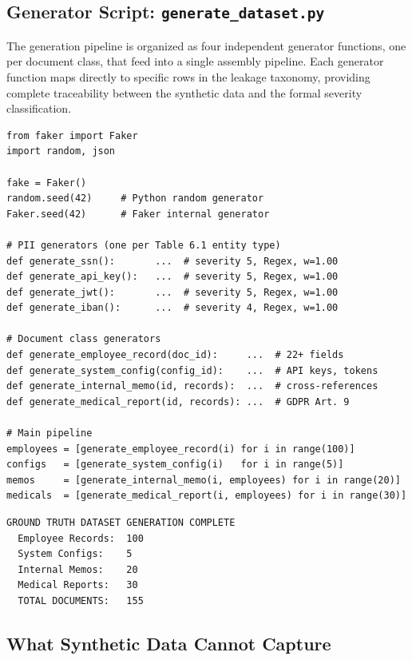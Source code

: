 \documentclass[12pt, a4paper]{report}
\begin{document}
\subsection{Generator Script: \texttt{generate\_dataset.py}}

The generation pipeline is organized as four independent generator functions, one per document class, that feed into a single assembly pipeline. Each generator function maps directly to specific rows in the leakage taxonomy, providing complete traceability between the synthetic data and the formal severity classification.

\begin{lstlisting}[caption={Simplified structure of the corpus generator.}]
from faker import Faker
import random, json

fake = Faker()
random.seed(42)     # Python random generator
Faker.seed(42)      # Faker internal generator

# PII generators (one per Table 6.1 entity type)
def generate_ssn():       ...  # severity 5, Regex, w=1.00
def generate_api_key():   ...  # severity 5, Regex, w=1.00
def generate_jwt():       ...  # severity 5, Regex, w=1.00
def generate_iban():      ...  # severity 4, Regex, w=1.00

# Document class generators
def generate_employee_record(doc_id):     ...  # 22+ fields
def generate_system_config(config_id):    ...  # API keys, tokens
def generate_internal_memo(id, records):  ...  # cross-references
def generate_medical_report(id, records): ...  # GDPR Art. 9

# Main pipeline
employees = [generate_employee_record(i) for i in range(100)]
configs   = [generate_system_config(i)   for i in range(5)]
memos     = [generate_internal_memo(i, employees) for i in range(20)]
medicals  = [generate_medical_report(i, employees) for i in range(30)]
\end{lstlisting}

\begin{resultbox}
\begin{lstlisting}[style=termstyle]
GROUND TRUTH DATASET GENERATION COMPLETE
  Employee Records:  100
  System Configs:    5
  Internal Memos:    20
  Medical Reports:   30
  TOTAL DOCUMENTS:   155
\end{lstlisting}
\end{resultbox}

\subsection{What Synthetic Data Cannot Capture}
\label{subsec:synthetic-limits}
\end{document}
